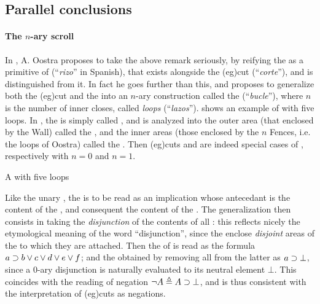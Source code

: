 \begin{scope}
\subsection{Parallel conclusions}

\paragraph{The $n$-ary scroll}

In \cite{oostra_graficos_2010}, A. Oostra proposes to take the above remark
seriously, by reifying the  as a primitive  of 
(``\emph{rizo}'' in Spanish), that exists alongside the \kl(eg){cut}
(``\emph{corte}''), and is distinguished from it. In fact he goes further than
this, and proposes to generalize both the \kl(eg){cut} and the  into
an $n$-ary construction called the  (``\emph{bucle}''), where $n$ is
the number of inner closes, called \emph{loops} (``\emph{lazos}'').
 shows an example of  with five loops. In
\cite{minghui_graphical_2019}, the  is simply called , and is analyzed into the outer area (that enclosed by the Wall) called
the , and the inner areas (those enclosed by the $n$ Fences, i.e.
the loops of Oostra) called the . Then \kl(eg){cuts} and
 are indeed special cases of , respectively with
$n = 0$ and $n = 1$.

\begin{marginfigure}
  \caption{A  with five loops}
\end{marginfigure}

Like the unary , the  is to be read as an
implication whose antecedant is the content of the , and consequent the
content of the . The generalization then consists in taking the
\emph{disjunction} of the contents of all : this reflects nicely the
etymological meaning of the word ``disjunction'', since the  enclose
\emph{disjoint} areas of the  to which they are attached. Then the
 of  is read as the
formula $a \supset b \lor c \lor d \lor e \lor f$; and the  obtained by removing all  from the latter as $a
\supset \bot$, since a $0$-ary disjunction is naturally evaluated to its neutral
element $\bot$. This coincides with the  reading of negation
$\neg A \triangleq A \supset \bot$, and is thus consistent with the interpretation of
\kl(eg){cuts} as negations.


\end{scope}
